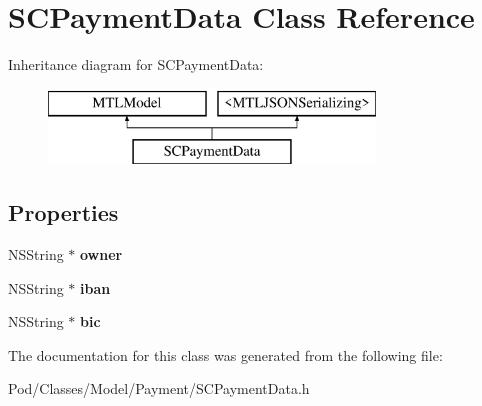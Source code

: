 \hypertarget{interface_s_c_payment_data}{}\section{S\+C\+Payment\+Data Class Reference}
\label{interface_s_c_payment_data}
Inheritance diagram for S\+C\+Payment\+Data\+:\begin{figure}[H]
\begin{center}
\leavevmode
\includegraphics[height=2.000000cm]{interface_s_c_payment_data}
\end{center}
\end{figure}
\subsection*{Properties}
\begin{DoxyCompactItemize}
\item 
N\+S\+String $\ast$ {\bfseries owner}\hypertarget{interface_s_c_payment_data_a0f27b11ba9e116439b19c8cde8a2f294}{}\label{interface_s_c_payment_data_a0f27b11ba9e116439b19c8cde8a2f294}

\item 
N\+S\+String $\ast$ {\bfseries iban}\hypertarget{interface_s_c_payment_data_af2226369a7f9a453127e8829a26505ca}{}\label{interface_s_c_payment_data_af2226369a7f9a453127e8829a26505ca}

\item 
N\+S\+String $\ast$ {\bfseries bic}\hypertarget{interface_s_c_payment_data_a69f10e02b96dc604fd76e8b4b65e3864}{}\label{interface_s_c_payment_data_a69f10e02b96dc604fd76e8b4b65e3864}

\end{DoxyCompactItemize}


The documentation for this class was generated from the following file\+:\begin{DoxyCompactItemize}
\item 
Pod/\+Classes/\+Model/\+Payment/S\+C\+Payment\+Data.\+h\end{DoxyCompactItemize}
